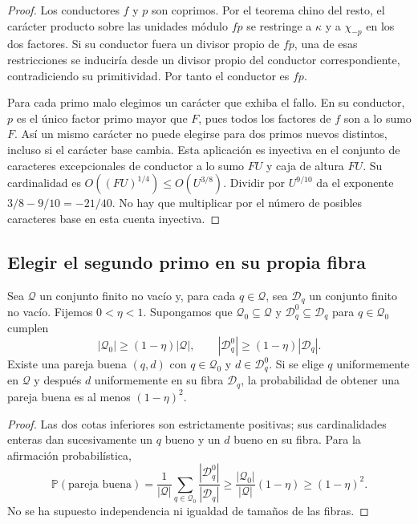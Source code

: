 \begin{proof}
Los conductores $f$ y $p$ son coprimos. Por el teorema chino del resto,
el carácter producto sobre las unidades módulo $fp$ se restringe
a $\kappa$ y a $\chi_{-p}$ en los dos factores. Si su conductor
fuera un divisor propio de $fp$, una de esas restricciones se
induciría desde un divisor propio del conductor correspondiente,
contradiciendo su primitividad. Por tanto el conductor es $fp$.

Para cada primo malo elegimos un carácter que exhiba el fallo.
En su conductor, $p$ es el único factor primo mayor que $F$,
pues todos los factores de $f$ son a lo sumo $F$. Así un mismo
carácter no puede elegirse para dos primos nuevos distintos,
incluso si el carácter base cambia. Esta aplicación es inyectiva
en el conjunto de caracteres excepcionales de conductor a lo sumo
$FU$ y caja de altura $FU$. Su cardinalidad es
$O((FU)^{1/4})\le O(U^{3/8})$.
Dividir por $U^{9/10}$ da el exponente
$3/8-9/10=-21/40$. No hay que multiplicar por el número de posibles
caracteres base en esta cuenta inyectiva.
\end{proof}

\subsection{Elegir el segundo primo en su propia fibra}

\begin{lema}
\label{lem:aux-fibras}
Sea $\mathcal Q$ un conjunto finito no vacío y, para cada $q\in\mathcal Q$,
sea $\mathcal D_q$ un conjunto finito no vacío. Fijemos $0<\eta<1$.
Supongamos que $\mathcal Q_0\subseteq\mathcal Q$ y
$\mathcal D_q^0\subseteq\mathcal D_q$ para $q\in\mathcal Q_0$ cumplen
\begin{equation}
 |\mathcal Q_0|\ge(1-\eta)|\mathcal Q|,\qquad
 |\mathcal D_q^0|\ge(1-\eta)|\mathcal D_q|.
 \label{eq:aux-fibras}
\end{equation}
Existe una pareja buena $(q,d)$ con $q\in\mathcal Q_0$ y
$d\in\mathcal D_q^0$. Si se elige $q$ uniformemente en $\mathcal Q$
y después $d$ uniformemente en su fibra $\mathcal D_q$, la probabilidad
de obtener una pareja buena es al menos $(1-\eta)^2$.
\end{lema}

\begin{proof}
Las dos cotas inferiores son estrictamente positivas; sus cardinalidades
enteras dan sucesivamente un $q$ bueno y un $d$ bueno en su fibra.
Para la afirmación probabilística,
\[
 \mathbb P(\text{pareja buena})
 =\frac1{|\mathcal Q|}\sum_{q\in\mathcal Q_0}
             \frac{|\mathcal D_q^0|}{|\mathcal D_q|}
 \ge\frac{|\mathcal Q_0|}{|\mathcal Q|}(1-\eta)
 \ge(1-\eta)^2.
\]
No se ha supuesto independencia ni igualdad de tamaños de las fibras.
\end{proof}

